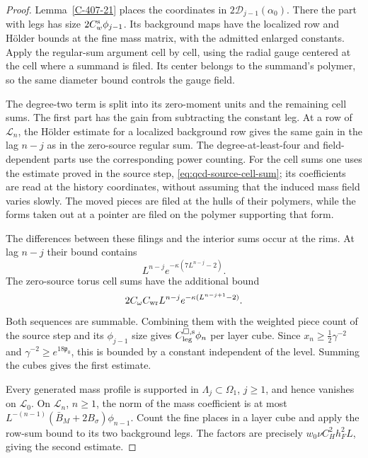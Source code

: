 \documentclass[11pt,letterpaper,reqno]{amsart}
\theoremstyle{definition}
\theoremstyle{remark}
\begin{document}
\begin{proof}
Lemma~\ref{C-407-21} places the coordinates in
$2\mathscr D_{j-1}(\alpha_0)$. There the part with legs has size
$2C_w^{\rm s}\phi_{j-1}$. Its background maps have the localized
row and H\"older bounds at the fine mass matrix, with the admitted
enlarged constants. Apply the regular-sum argument cell by cell,
using the radial gauge centered at the cell where a summand is
filed. Its center belongs to the summand's polymer, so the same
diameter bound controls the gauge field.

The degree-two term is split into its zero-moment units and the
remaining cell sums. The first part has the gain from subtracting
the constant leg. At a row of $\mathcal L_n$, the H\"older estimate
for a localized background row gives the same gain in the lag
$n-j$ as in the zero-source regular sum. The degree-at-least-four
and field-dependent parts use the corresponding power counting.
For the cell sums one uses the estimate proved in the source step,
\eqref{eq:qcd-source-cell-sum}; its coefficients are read at the
history coordinates, without assuming that the induced mass field
varies slowly. The moved pieces are filed at the hulls of their
polymers, while the forms taken out at a pointer are filed on the
polymer supporting that form.

The differences between these filings and the interior sums occur
at the rims. At lag $n-j$ their bound contains
\[
 L^{n-j}e^{-\kappa(7L^{n-j}-2)}.
\]
The zero-source torus cell sums have the additional bound
\[
 2C_\omega C_{\rm wr}L^{n-j}
                   e^{-\kappa(L^{n-j+1}-2)}.
\]
Both sequences are summable. Combining them with the weighted
piece count of the source step and its $\phi_{j-1}$ size gives
$C^{{\square},{\rm s}}_{\rm leg}\phi_n$ per layer cube.
Since $x_n\ge\tfrac12\gamma^{-2}$ and
$\gamma^{-2}\ge e^{18\mathfrak p_0}$, this is bounded by a
constant independent of the level. Summing the cubes gives the
first estimate.

Every generated mass profile is supported in $\Lambda_j\subset\Omega_1$,
$j\ge1$, and hence vanishes on $\mathcal L_0$.
On $\mathcal L_n$, $n\ge1$, the norm of the mass coefficient is at most
$L^{-(n-1)}(\bar B_M+2B_\sigma)\phi_{n-1}$. Count the fine
places in a layer cube and apply the row-sum bound to its two
background legs. The factors are precisely
$w_0\nu C_H^2h_F^2L$, giving the second estimate.
\end{proof}
\end{document}
